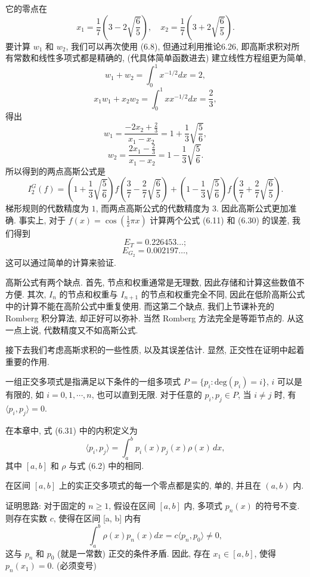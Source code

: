 \documentclass[a4paper]{ctexart}
\newcommand{\hl}[1]
{\noindent {\bf {#1}}}
\begin{document}
{它的零点在
$$ 
x_1 = \frac{1}{7}\left(3 - 2\sqrt{\frac{6}{5}}\right), 
\quad x_2 = \frac{1}{7}\left(3 + 2\sqrt{\frac{6}{5}}\right). 
$$
要计算 $w_1$ 和 $w_2$, 我们可以再次使用 (6.8), 
但通过利用推论6.26, 即高斯求积对所有常数和线性多项式都是精确的, 
(代具体简单函数进去) 建立线性方程组更为简单, 
$$ 
w_1 + w_2 = \int_{0}^{1} x^{-1/2}dx = 2, 
$$
$$ 
x_1w_1 + x_2w_2 = \int_{0}^{1} xx^{-1/2}dx = \frac{2}{3}, 
$$
得出
$$ 
w_1 
= \frac{-2x_2 + \frac{2}{3}}{x_1 - x_2} 
= 1 + \frac{1}{3}\sqrt{\frac{5}{6}}, 
$$
$$ 
w_2 
= \frac{2x_1 - \frac{2}{3}}{x_1 - x_2} 
= 1 - \frac{1}{3}\sqrt{\frac{5}{6}}. 
$$
所以得到的两点高斯公式是
$$ 
I^G_2(f) 
= \left(1 + \frac{1}{3}\sqrt{\frac{5}{6}}\right)f\left(\frac{3}{7} 
- \frac{2}{7}\sqrt{\frac{6}{5}}\right) 
+ \left(1 - \frac{1}{3}\sqrt{\frac{5}{6}}\right)f\left(\frac{3}{7} 
+ \frac{2}{7}\sqrt{\frac{6}{5}}\right). 
$$ 
梯形规则的代数精度为 $1$, 而两点高斯公式的代数精度为 $3$. 
因此高斯公式更加准确. 
事实上, 对于 $f(x) = \cos\left(\frac{1}{2}\pi x\right)$ 计算两个公式 
(6.11) 和 (6.30) 的误差, 我们得到
$$ 
E_T = 0.226453\ldots; 
$$
$$ 
E_{G_2} = 0.002197\ldots, 
$$
这可以通过简单的计算来验证. 

高斯公式有两个缺点. 首先, 节点和权重通常是无理数, 因此存储和计算这些数值不方便. 其次, $I_n$ 
的节点和权重与 $I_{n+1}$ 的节点和权重完全不同, 因此在低阶高斯公式中的计算不能在高阶公式中重复使用.
而这第二个缺点, 我们上节课补充的 Romberg 积分算法, 却正好可以弥补. 当然 Romberg 方法完全是等距节点的. 
从这一点上说, 代数精度又不如高斯公式. 

接下去我们考虑高斯求积的一些性质, 以及其误差估计. 显然, 正交性在证明中起着重要的作用. 

\hl{定义 6.29} 一组正交多项式是指满足以下条件的一组多项式 
$P = \{p_i : \text{deg}(p_i) = i\}$, $i$ 可以是有限的, 如 $i = 0, 1, \cdots, n$, 也可以直到无限. 
对于任意的 $p_i, p_j \in P$, 当 $i \neq j$ 时, 有 $\langle p_i, p_j\rangle = 0$. 

\hl{例 6.30} 在本章中, 式 (6.31) 中的内积定义为
$$
\langle p_i, p_j\rangle = \int_{a}^{b} p_i(x) p_j(x) \rho(x) \, dx, 
$$
其中 $[a, b]$ 和 $\rho$ 与式 (6.2) 中的相同. 

\hl{定理 6.31} 在区间 $[a, b]$ 上的实正交多项式的每一个零点都是实的, 单的, 并且在 $(a, b)$ 内.

证明思路: 对于固定的 $n \geq 1$, 假设在区间 $[a, b]$ 内, 多项式 $p_n(x)$ 的符号不变. 
则存在实数 $c$, 使得在区间 [a, b] 内有
$$
\int_a^b \rho(x)p_n(x) dx = c \langle p_n, p_0 \rangle \neq 0,
$$
这与 $p_n$ 和 $p_0$ (就是一常数) 正交的条件矛盾. 因此, 存在 $x_1 \in [a, b]$, 使得 $p_n(x_1) = 0$.
(必须变号)

}
\end{document}
